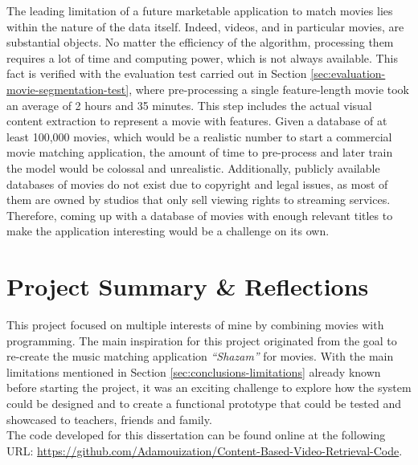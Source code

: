 The leading limitation of a future marketable application to match movies lies within the nature of the data itself. Indeed, videos, and in particular movies, are substantial objects. No matter the efficiency of the algorithm, processing them requires a lot of time and computing power, which is not always available. This fact is verified with the evaluation test carried out in Section \ref{sec:evaluation-movie-segmentation-test}, where pre-processing a single feature-length movie took an average of 2 hours and 35 minutes. This step includes the actual visual content extraction to represent a movie with features. Given a database of at least 100,000 movies, which would be a realistic number to start a commercial movie matching application, the amount of time to pre-process and later train the model would be colossal and unrealistic. Additionally, publicly available databases of movies do not exist due to copyright and legal issues, as most of them are owned by studios that only sell viewing rights to streaming services. Therefore, coming up with a database of movies with enough relevant titles to make the application interesting would be a challenge on its own.
    

\section{Project Summary \& Reflections}

This project focused on multiple interests of mine by combining movies with programming. The main inspiration for this project originated from the goal to re-create the music matching application \textit{``Shazam''} for movies. With the main limitations mentioned in Section \ref{sec:conclusions-limitations} already known before starting the project, it was an exciting challenge to explore how the system could be designed and to create a functional prototype that could be tested and showcased to teachers, friends and family.\\ 
The code developed for this dissertation can be found online at the following URL: \url{https://github.com/Adamouization/Content-Based-Video-Retrieval-Code}.